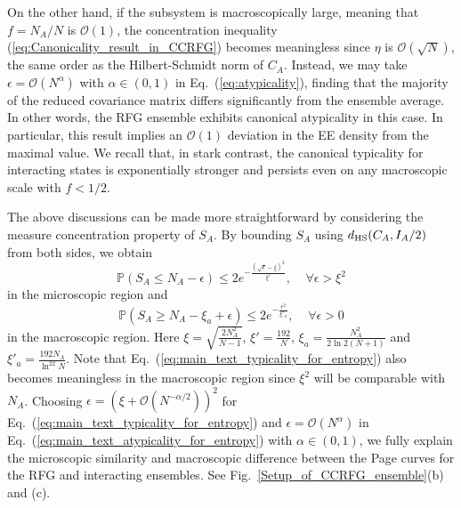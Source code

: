 \documentclass[twocolumn,english,prl,aps,superscriptaddress,amsmath,amssymb,floatfix]{revtex4-2}
\begin{document}
On the other hand, 
if the subsystem is macroscopically large, meaning that $f=N_A/N$ is $\mathcal{O}(1)$, the concentration inequality (\ref{eq:Canonicality_result_in_CCRFG}) becomes meaningless since $\eta$ is $\mathcal{O}(\sqrt{N})$, the same order as the Hilbert-Schmidt norm of $C_A$. Instead, we may take $\epsilon=\mathcal{O}(N^\alpha)$ with $\alpha\in(0,1)$ in Eq.~(\ref{eq:atypicality}), finding that the majority of the reduced covariance matrix differs significantly from the ensemble average. In other words, the RFG ensemble exhibits canonical atypicality in this case. In particular, this result implies an $\mathcal{O}(1)$ deviation in the EE density from the maximal value. We recall that, in stark contrast, the canonical typicality for interacting states is exponentially stronger and persists even on any macroscopic scale with $f<1/2$. 



The above discussions can be made more straightforward 
by considering the measure concentration property of 
$S_{A}$. By bounding $S_A$ using $d_{\rm HS}(C_A,I_A/2)$ from both sides, we obtain \cite{SM} 
\begin{equation}
\mathbb{P}(S_{A}\leq N_{A}-\epsilon)\le2e^{-\frac{(\sqrt{\epsilon}-\xi)^{2}}{\xi'}},\;\;\;\;\forall\epsilon>\xi^2
\label{eq:main_text_typicality_for_entropy}
\end{equation}
in the microscopic region and
\begin{equation}
\mathbb{P}(S_{A}\geq N_{A}-\xi_{a}+\epsilon) \leq2e^{-\frac{\epsilon^{2}}{\xi'_{a}}},\;\;\;\;
\forall\epsilon>0
\label{eq:main_text_atypicality_for_entropy}
\end{equation}
in the macroscopic region. Here $\xi=\sqrt{\frac{2N_{A}^{2}}{N-1}}$, $\xi'=\frac{192}{N}$, $\xi_{a}=\frac{N_{A}^{2}}{2\ln2(N+1)}$ and $\xi'_{a}=\frac{192N_{A}}{\ln^22N}$. 
Note that Eq.~(\ref{eq:main_text_typicality_for_entropy}) also becomes meaningless in the macroscopic region since $\xi^2$ will be comparable with $N_A$.
Choosing $\epsilon=(\xi+\mathcal{O}(N^{-\alpha/2}))^2$ for Eq.~(\ref{eq:main_text_typicality_for_entropy}) and $\epsilon=\mathcal{O}(N^\alpha)$ in Eq.~(\ref{eq:main_text_atypicality_for_entropy}) with $\alpha\in(0,1)$, we fully explain the microscopic similarity and macroscopic difference 
between 
the Page curves for the 
RFG and interacting ensembles. 
See Fig.~\ref{Setup_of_CCRFG_ensemble}(b) and (c).
\end{document}
